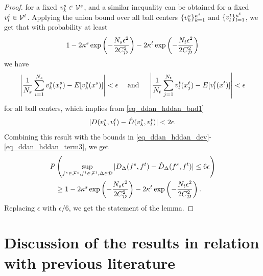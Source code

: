 \documentclass[review,supplement,onefignum,onetabnum]{siamonline250211}
\begin{document}
\begin{proof}
%
for a fixed $v^s_k \in \mathcal{V}^s$, and a similar inequality can be obtained for a fixed  $v^t_l \in \mathcal{V}^t$. Applying the union bound over all ball centers  $\{ v^s_k \}_{k=1}^{\kappa^s}$ 
and $\{ v^t_l \}_{l=1}^{\kappa^t}$, we get that with probability at least 
%
\begin{equation*}
\begin{split}
1 - 2 \kappa^s \exp \left( -\frac{N_s \epsilon^2}{2 {C^2_{\mathcal{D}}}} \right) 
- 2 \kappa^t \exp \left( -\frac{N_t \epsilon^2}{2 {C^2_{\mathcal{D}}}} \right) 
\end{split}
\end{equation*}
%
we have
%
\begin{equation*}
\begin{split}
\left |
\frac{1}{N_s} 
  \sum_{i=1}^{N_s} v^s_k (x^s_i)
 - E[v^s_k(x^s)]
\right |  < \epsilon 
\quad
\text{ and }
\quad
\left |
\frac{1}{N_t} 
  \sum_{j=1}^{N_t} v^t_l (x^t_j)
 - E[v^t_l(x^t)]
\right |  < \epsilon 
\end{split}
\end{equation*}
%
for all ball centers, which implies from \eqref{eq_ddan_hddan_bnd1}
%
\begin{equation*}
\begin{split}
| D(v^s_k, v^t_l)  
- \hat{D}(v^s_k, v^t_l)  |  
< 2 \epsilon.
\end{split}
\end{equation*}
%
Combining this result with the bounds in  \eqref{eq_ddan_hddan_dev}-\eqref{eq_ddan_hddan_term3}, we get
%
\begin{equation*}
\begin{split}
P & \left(
\sup_{f^s \in \mathcal{F}^s, f^t \in \mathcal{F}^t, \Delta \in \mathcal{D}} 
 |  D_{\Delta}(f^s, f^t)  - \hat{D}_{\Delta}(f^s, f^t)  | \leq 6 \epsilon
 \right ) \\
& \geq
 1 - 2 \kappa^s \exp \left( -\frac{N_s \epsilon^2}{2 {C^2_{\mathcal{D}}}} \right) 
- 2 \kappa^t \exp \left( -\frac{N_t \epsilon^2}{2 {C^2_{\mathcal{D}}}} \right) .
\end{split}
\end{equation*}
%
Replacing $ \epsilon$ with $\epsilon/6$, we get the statement of the lemma.
%
\end{proof}




\clearpage

\section{Discussion of the results in relation with previous literature}
\label{sec_rel_work}
\end{document}
